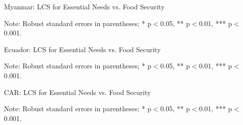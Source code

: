 \documentclass[11pt,harvard]{article}
\begin{document}
	\begin{table}[htbp]
		\centering
		\begin{adjustbox}{max width=\textwidth}
			\begin{threeparttable}
				\caption{Myanmar: LCS for Essential Needs vs. Food Security}
				\scriptsize
				 
				\label{tab:LCS_F2F_EN_FS_Myanmar}
				\begin{tablenotes}
					\item Note: Robust standard errors in parentheses; * p$<$0.05, ** p$<$0.01, *** p$<$0.001. 
				\end{tablenotes}
			\end{threeparttable}
		\end{adjustbox}
	\end{table}
	
	
	\begin{table}[htbp]
		\centering
		\begin{adjustbox}{max width=\textwidth}
			\begin{threeparttable}
				\caption{Ecuador: LCS for Essential Needs vs. Food Security}
				\scriptsize
				 
				\label{tab:LCS_F2F_EN_FS_Ecuador}
				\begin{tablenotes}
					\item Note: Robust standard errors in parentheses; * p$<$0.05, ** p$<$0.01, *** p$<$0.001. 
				\end{tablenotes}
			\end{threeparttable}
		\end{adjustbox}
	\end{table}
	
	
	\begin{table}[htbp]
		\centering
		\begin{adjustbox}{max width=\textwidth}
			\begin{threeparttable}
				\caption{CAR: LCS for Essential Needs vs. Food Security}
				\scriptsize
				 
				\label{tab:LCS_F2F_EN_FS_CAR}
				\begin{tablenotes}
					\item Note: Robust standard errors in parentheses; * p$<$0.05, ** p$<$0.01, *** p$<$0.001. 
				\end{tablenotes}
			\end{threeparttable}
		\end{adjustbox}
	\end{table}
	
\end{document}
